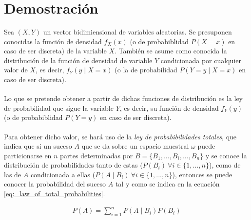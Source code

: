 \documentclass{article}
\begin{document}
	\maketitle



  \section{Demostración}

    \paragraph{}
    Sea $(X, Y)$ un vector bidimiensional de variables aleatorias. Se presuponen conocidas la función de densidad  $f_X(x)$ (o de probabiblidad $P(X = x)$ en caso de ser discreta) de la variable $X$. También se asume como conocida la distribución de la función de densidad de variable $Y$ condicionada por cualquier valor de $X$, es decir, $f_Y(y \mid X = x)$ (o la de probabilidad $P(Y = y \mid X = x)$ en caso de ser discreta).

    \paragraph{}
    Lo que se pretende obtener a partir de dichas funciones de distribución es la ley de probabilidad que sigue la variable $Y$, es decir, su función de densidad $f_Y(y)$ (o de probabiblidad $P(Y = y)$ en caso de ser discreta).

    \paragraph{}
    Para obtener dicho valor, se hará uso de la \emph{ley de probabibilidades totales}, que indica que si un suceso $A$ que se da sobre un espacio muestral $\omega$ puede particionarse en $n$ partes determinadas por $B=\{B_1, ..., B_i, ..., B_n \}$ y se conoce la distribución de probabilidades tanto de estas ($P(B_i)  \ \forall i \in \{1,...,n\}$), como de las de $A$ condicionada a ellas ($P(A \mid B_i) \ \forall i \in \{1,...,n\}$), entonces se puede conocer la probabilidad del suceso $A$ tal y como se indica en la ecuación \eqref{eq:_law_of_total_probabilities}.

    \begin{align}
    \label{eq:_law_of_total_probabilities}
      P(A) = \sum_{i=1}^nP(A \mid B_i)P(B_i)
    \end{align}
\end{document}
